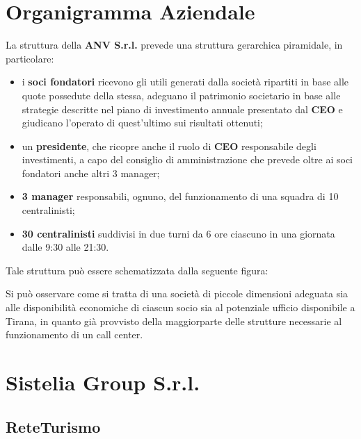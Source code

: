 \section[Organigramma Aziendale]{Organigramma Aziendale}
La struttura della\textbf{ \ac{ANV S.r.l.}} prevede una struttura gerarchica piramidale, in particolare:
\begin{itemize}

 	\item i \textbf{soci fondatori} ricevono gli utili generati dalla società ripartiti in base alle quote possedute della stessa, adeguano il patrimonio societario in base alle strategie descritte nel piano di investimento annuale presentato dal \textbf{\ac{CEO}} e giudicano l'operato di quest'ultimo sui risultati ottenuti; 
 	
	\item un \textbf{presidente}, che ricopre anche il ruolo di \textbf{\ac{CEO}} responsabile degli investimenti, a capo del consiglio di amministrazione che prevede oltre ai soci fondatori anche altri 3 manager;
	
	\item \textbf{3 manager} responsabili, ognuno, del funzionamento di una squadra di 10 centralinisti;
	
	\item \textbf{30 centralinisti} suddivisi in due turni da 6 ore ciascuno in una giornata dalle 9:30 alle 21:30. 

\end{itemize}  

Tale struttura può essere schematizzata dalla seguente figura:
\newline


Si può osservare come si tratta di una società di piccole dimensioni adeguata sia alle disponibilità economiche di ciascun socio sia al potenziale ufficio disponibile a Tirana, in quanto già provvisto della maggiorparte delle strutture necessarie al funzionamento di un call center.

\section[Sistelia Group S.r.l.]{Sistelia Group S.r.l.}

\subsection[ReteTurismo]{ReteTurismo}

